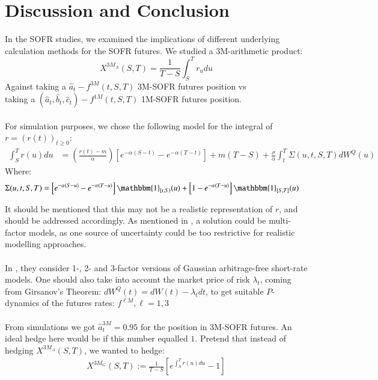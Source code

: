 \chapter{Discussion and Conclusion}

In the SOFR studies, we examined the implications of different underlying calculation methods for the SOFR futures. We studied a 3M-arithmetic product: 
\[
X^{3M_{A}}(S,T) = \frac{1}{T-S}\int_{S}^{T}r_{u}du
\]
Against taking  a $\hat{a}_{t}-f^{3M}(t,S,T)$ 3M-SOFR futures position vs \\ 
taking  a $(\hat{a}_{t}, \hat{b}_{t}, \hat{c}_{t})-f^{1M}(t,S,T)$ 1M-SOFR futures position.  
\\~\\
For simulation purposes, we chose the following model for the integral of $r = (r(t))_{t\geq 0}$: 
\begin{align*}
\int_{S}^{T}r(u)du 
&= 
\left(
\frac{r(t)-m}{\alpha}
\right)
\left[
e^{-\alpha(S-t)} - e^{-\alpha(T-t)}
\right]
+ m(T-S) 
+ 
\frac{\sigma}{\alpha}\int_{t}^{T}\Sigma(u,t,S,T)dW^{Q}(u)   
\end{align*}
Where: 
\begin{align*}
\Sigma(u,t,S,T) &= 
\left[
e^{-\alpha(S-u)}-e^{-\alpha(T-u)}
\right]\mathbbm{1}_{[t,S)}(u) 
+ 
\left[
1-e^{-\alpha(T-u)}
\right]\mathbbm{1}_{[S,T]}(u)
\end{align*}

It should be mentioned that this may not be a realistic representation of $r$, and should be addressed accordingly. As mentioned in \cite{brigo2013interest}, a solution could be multi-factor models, as one source of uncertainty could be too restrictive for realistic modelling approaches.
\\~\\
In \cite{Skov_2020}, they consider 1-, 2- and 3-factor versions of Gaussian arbitrage-free short-rate models. One should also take into account the market price of risk $\lambda_{t}$, coming from Girsanov's Theorem: $dW^{Q}(t) = dW(t) - \lambda_{t}dt$, to get suitable  $P$-dynamics of the futures rates: $f^{\ell M}, \ell = 1,3$
\\~\\
From simulations we got $\hat{a}_{t}^{3M} = 0.95$ for the position in 3M-SOFR futures. An ideal hedge here would be if this number equalled $1$. Pretend that instead of hedging $X^{3M_{A}}(S,T)$, we wanted to hedge: 
\begin{align*}
X^{3M_{G}}(S,T) := \frac{1}{T-S}\left[
e^{\int_{S}^{T}r(u)du}-1
\right]    
\end{align*}

